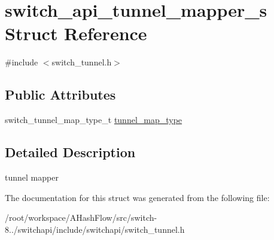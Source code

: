 \hypertarget{structswitch__api__tunnel__mapper__s}{\section{switch\+\_\+api\+\_\+tunnel\+\_\+mapper\+\_\+s Struct Reference}
\label{structswitch__api__tunnel__mapper__s}
}


{\ttfamily \#include $<$switch\+\_\+tunnel.\+h$>$}

\subsection*{Public Attributes}
\begin{DoxyCompactItemize}
\item 
switch\+\_\+tunnel\+\_\+map\+\_\+type\+\_\+t \hyperlink{group__Tunnel_gaabdc00f1db835c1e46b0c8c8054d6d5e}{tunnel\+\_\+map\+\_\+type}
\end{DoxyCompactItemize}


\subsection{Detailed Description}
tunnel mapper 

The documentation for this struct was generated from the following file\+:\begin{DoxyCompactItemize}
\item 
/root/workspace/\+A\+Hash\+Flow/src/switch-\/8../switchapi/include/switchapi/switch\+\_\+tunnel.\+h\end{DoxyCompactItemize}
